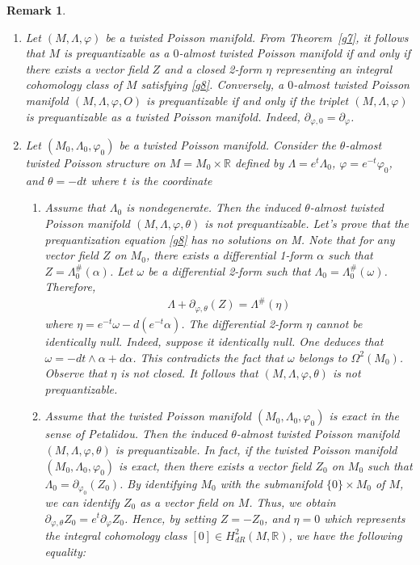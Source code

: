\documentclass[a4paper,10pt]{article}
\numberwithin{equation}{section}
\theoremstyle{plain}
\newtheorem{remark}[theorem]{Remark}
\begin{document}
\begin{remark}~ \label{nb3}
\begin{enumerate}
\item Let $(M,\Lambda,\varphi)$ be a twisted Poisson manifold. From  Theorem~\ref{g7}, it follows that $M$ is prequantizable as a $0$-almost twisted Poisson manifold if and only if there exists a vector field $Z$   and a  closed 2-form $\eta$  representing  an integral cohomology class of $M$  satisfying \eqref{g8}.  Conversely, a $0$-almost twisted Poisson manifold $(M,\Lambda,\varphi,O)$ is prequantizable if and only if the triplet $(M, \Lambda,\varphi)$ is prequantizable as a twisted Poisson manifold. Indeed,   $\partial_{\varphi,0}=\partial_{\varphi}$. 			 
\item Let $(M_0,\Lambda_0,\varphi_0)$ be a twisted Poisson manifold.  Consider the  $\theta$-almost twisted Poisson structure on $M=M_0\times\mathbb{R}$ defined by
$\Lambda=e^t\Lambda_0$, $\varphi=e^{-t}\varphi_0$,  and $\theta=-dt$  where $t$ is the  coordinate
\begin{enumerate}
\item Assume  that $\Lambda_0$  is nondegenerate. Then the  induced  $\theta$-almost twisted Poisson manifold  $(M,\Lambda,\varphi, \theta)$  is not  prequantizable. Let's prove that the prequantization equation \eqref{g8} has no solutions on M.
Note that for any vector field  $Z$ on $M_0$, there exists a  differential 1-form $\alpha$ such that $Z=\Lambda_0^{\#}(\alpha)$.  Let $\omega$  be a differential  2-form such that $\Lambda_0=\Lambda_0^{\#}(\omega)$.  Therefore,
\begin{align}
\Lambda+\partial_{\varphi,\theta}(Z)=\Lambda^{\#}(\eta)
\end{align}
where $\eta=e^{-t}\omega-d(e^{-t}\alpha)$. The differential 2-form $\eta$ cannot be identically null. Indeed, suppose it identically null. One deduces that $\omega=-dt\wedge\alpha+d\alpha$. This contradicts the fact that $\omega$ belongs to  $\Omega^2(M_0)$. Observe that  $\eta$ is  not closed. It follows that   $(M,\Lambda,\varphi, \theta)$  is not  prequantizable.
\item
Assume  that the    twisted Poisson manifold $(M_0,\Lambda_0,\varphi_0)$  is exact in the sense of Petalidou. Then   the  induced  $\theta$-almost twisted Poisson manifold  $(M,\Lambda,\varphi, \theta)$ is prequantizable. In fact, if  the    twisted Poisson manifold $(M_0,\Lambda_0,\varphi_0)$ is exact, then there exists a vector field $Z_0$ on $M_0$ such that $\Lambda_0= \partial_{\varphi_0}(Z_0)$. By identifying $M_0$ with the submanifold   $\{0\}\times M_0$ of $M$, we can identify  $Z_0$  as a  vector  field on $M$. Thus,  we obtain $\partial_{\varphi,\theta}Z_0=e^t\partial_{\varphi}Z_0$. Hence, by setting $Z=-Z_0$, and $\eta=0$ which represents the integral cohomology class $[0]\in H_{dR}^2(M,\mathbb{R})$, we have the following equality:

\end{enumerate}
\end{enumerate}
\end{remark}
\end{document}
